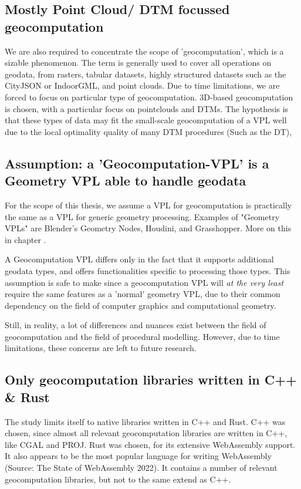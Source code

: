 \subsection*{Mostly Point Cloud/ DTM focussed geocomputation}

We are also required to concentrate the scope of 'geocomputation', which is a sizable phenomenon.
The term is generally used to cover all operations on geodata, from rasters, tabular datasets, highly structured datasets such as the CityJSON or IndoorGML, and point clouds. 
Due to time limitations, we are forced to focus on particular type of geocomputation.
3D-based geocomputation is chosen, with a particular focus on pointclouds and DTMs. 
The hypothesis is that these types of data may fit the small-scale geocomputation of a VPL well due to the local optimality quality of many DTM procedures (Such as the \ac{DT}), 

\subsection*{Assumption: a 'Geocomputation-VPL' is a Geometry VPL able to handle geodata}
For the scope of this thesis, we assume a VPL for geocomputation is practically the same as a VPL for generic geometry processing.
Examples of "Geometry VPLs" are Blender's Geometry Nodes, Houdini, and Grasshopper.
More on this in chapter .

A Geocomputation VPL differs only in the fact that it supports additional geodata types, and offers functionalities specific to processing those types.  
This assumption is safe to make since a geocomputation VPL will \emph{at the very least} require the same features as a 'normal' geometry VPL, due to their common dependency on the field of computer graphics and computational geometry.

Still, in reality, a lot of differences and nuances exist between the field of geocomputation and the field of procedural modelling. 
However, due to time limitations, these concerns are left to future research.
 
\subsection*{Only geocomputation libraries written in C++ \& Rust}
The study limits itself to native libraries written in C++ and Rust. 
C++ was chosen, since almost all relevant geocomputation libraries are written in C++, like CGAL and PROJ. 
Rust was chosen, for its extensive WebAssembly support. 
It also appears to be the most popular language for writing WebAssembly (Source: The State of WebAssembly 2022).
It contains a number of relevant geocomputation libraries, but not to the same extend as C++.

